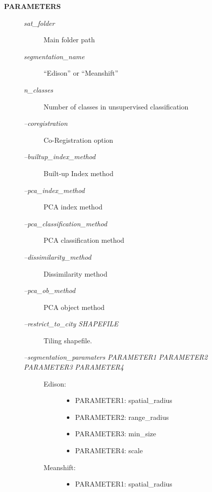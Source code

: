 \documentclass[letterpaper,10pt,english]{sphinxmanual}
\begin{document}
\begin{description}
\item[{\textbf{PARAMETERS}}] \leavevmode\begin{description}
\item[{\emph{sat\_folder}}] \leavevmode
Main folder path

\item[{\emph{segmentation\_name}}] \leavevmode
``Edison'' or ``Meanshift''

\item[{\emph{n\_classes}}] \leavevmode
Number of classes in unsupervised classification

\item[{\emph{--coregistration}}] \leavevmode
Co-Registration option

\item[{\emph{--builtup\_index\_method}}] \leavevmode
Built-up Index method

\item[{\emph{--pca\_index\_method}}] \leavevmode
PCA index method

\item[{\emph{--pca\_classification\_method}}] \leavevmode
PCA classification method

\item[{\emph{--dissimilarity\_method}}] \leavevmode
Dissimilarity method

\item[{\emph{--pca\_ob\_method}}] \leavevmode
PCA object method

\item[{\emph{--restrict\_to\_city SHAPEFILE}}] \leavevmode
Tiling shapefile.

\item[{\emph{--segmentation\_paramaters PARAMETER1 PARAMETER2 PARAMETER3 PARAMETER4}}] \leavevmode\begin{description}
\item[{Edison:}] \leavevmode\begin{itemize}
\item {} 
PARAMETER1: spatial\_radius

\item {} 
PARAMETER2: range\_radius

\item {} 
PARAMETER3: min\_size

\item {} 
PARAMETER4: scale

\end{itemize}

\item[{Meanshift:}] \leavevmode\begin{itemize}
\item {} 
PARAMETER1: spatial\_radius


\end{itemize}
\end{description}
\end{description}
\end{description}
\end{document}

